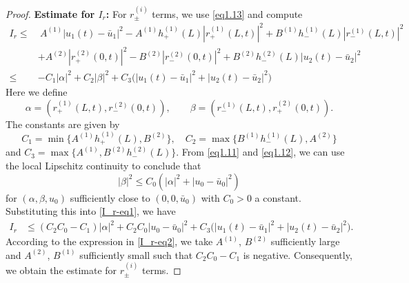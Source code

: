 \documentclass[10pt,a4paper]{amsart}
\begin{document}
\begin{proof}
\textbf{Estimate for $I_r$:} For $r_\pm^{(i)}$ terms, we use \eqref{eq1.13} and compute  
\begin{align}
I_r
\leq&~ A^{(1)} |u_1(t)-\bar{u}_1|^2 
-A^{(1)}h_+^{(1)}(L)|r_+^{(1)}(L,t)|^2+B^{(1)}h_-^{(1)}(L)|r_-^{(1)}(L,t)|^2 \nonumber\\[2mm]
&+A^{(2)} |r_+^{(2)}(0,t)|^2-B^{(2)} |r_-^{(2)}(0,t)|^2
 +B^{(2)}h_-^{(2)}(L)|u_2(t)-\bar{u}_2|^2\nonumber \\[2mm]
 \leq& -C_1|\alpha|^2+C_2|\beta|^2 +C_3\big(|u_1(t)-\bar{u}_1|^2+|u_2(t)-\bar{u}_2|^2\big)\label{I_r-eq1}
\end{align}
Here we define $$\alpha=(r_+^{(1)}(L,t), r_-^{(2)}(0,t)),\qquad \beta=(r_-^{(1)}(L,t), r_+^{(2)}(0,t)).$$
The constants are given by  
\begin{equation}\label{I_r-eq2}
C_1=\min\{A^{(1)}h_+^{(1)}(L), B^{(2)} \} ,\quad C_2=\max\{B^{(1)}h_-^{(1)}(L), A^{(2)} \}
\end{equation}
and $C_3=\max\{A^{(1)}, B^{(2)}h_-^{(2)}(L)\}$.
From \eqref{eq1.11} and \eqref{eq1.12}, we can use the local Lipschitz continuity to conclude that
\begin{equation}\label{beta-au}
|\beta|^2\leq C_0(|\alpha|^2+|u_0-\bar{u}_0|^2)
\end{equation}
for $(\alpha,\beta,u_0)$ sufficiently close to $(0,0,\bar{u}_0)$ with $C_0>0$ a constant.
Substituting this into \eqref{I_r-eq1}, we have 
\begin{align*}
    I_r &\leq (C_2C_0-C_1)|\alpha|^2+C_2C_0 |u_0-\bar{u}_0|^2+C_3\big(|u_1(t)-\bar{u}_1|^2+|u_2(t)-\bar{u}_2|^2\big).
\end{align*}
According to the expression in \eqref{I_r-eq2}, we take $A^{(1)}$, $B^{(2)}$ sufficiently large and $A^{(2)}$, $B^{(1)}$ sufficiently small such that $C_2C_0-C_1$ is negative. Consequently, we obtain the estimate for $r_\pm^{(i)}$ terms.


\end{proof}
\end{document}
